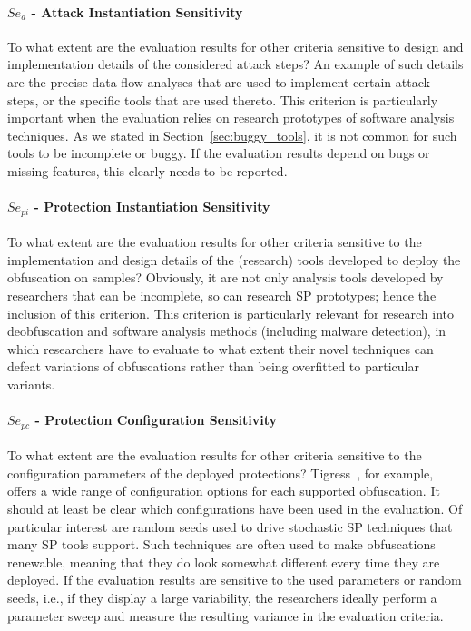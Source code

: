 \paragraph{$Se_{a}$ - Attack Instantiation Sensitivity} To what extent are the evaluation results for other criteria sensitive to design and implementation details of the considered attack steps? An example of such details are the precise data flow analyses that are used to implement certain attack steps, or the specific tools that are used thereto. This criterion is particularly important when the evaluation relies on research prototypes of software analysis techniques. As we stated in Section~\ref{sec:buggy_tools}, it is not common for such tools to be incomplete or buggy. If the evaluation results depend on bugs or missing features, this clearly needs to be reported. 

\paragraph{$Se_{pi}$ - Protection Instantiation Sensitivity} To what extent are the evaluation results for other criteria sensitive to the implementation and design details of the (research) tools developed to deploy the obfuscation on samples? Obviously, it are not only analysis tools developed by researchers that can be incomplete, so can research SP prototypes; hence the inclusion of this criterion. This criterion is particularly relevant for research into deobfuscation and software analysis methods (including malware detection), in which researchers have to evaluate to what extent their novel techniques can defeat variations of obfuscations rather than being overfitted to particular variants.  

\paragraph{$Se_{pc}$ - Protection Configuration Sensitivity} To what extent are the evaluation results for other criteria sensitive to the configuration parameters of the deployed protections? Tigress~\cite{tigress2023}, for example, offers a wide range of configuration options for each supported obfuscation. It should at least be clear which configurations have been used in the evaluation. Of particular interest are random seeds used to drive stochastic SP techniques that many SP tools support. Such techniques are often used to make obfuscations renewable, meaning that they do look somewhat different every time they are deployed. If the evaluation results are sensitive to the used parameters or random seeds, i.e., if they display a large variability, the researchers ideally perform a parameter sweep and measure the resulting variance in the evaluation criteria. 


